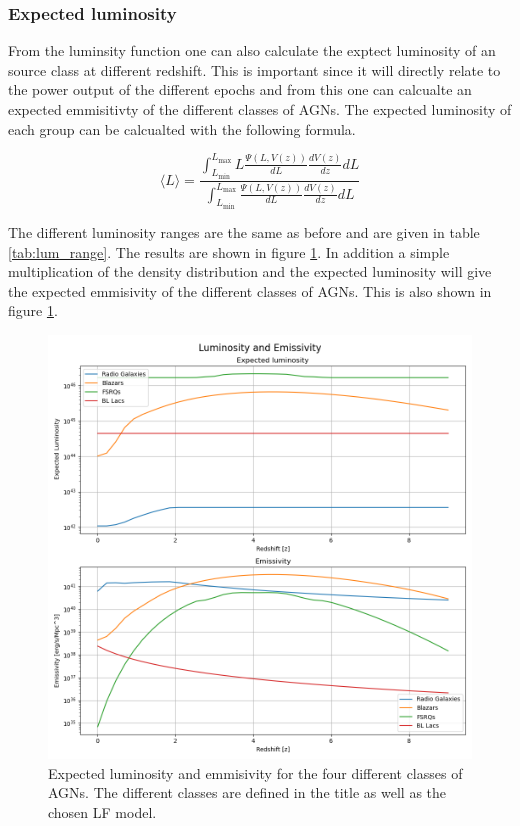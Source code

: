 \documentclass{article}
\begin{document}
\subsubsection{Expected luminosity}
From the luminsity function one can also calculate the exptect luminosity of an source class at different redshift. This is important since it will directly relate to the 
power output of the different epochs and from this one can calcualte an expected emmisitivty of the different classes of AGNs. 
The expected luminosity of each group can be calcualted with the following formula. 

\begin{equation}
    \langle L \rangle = \frac{\int_{L_{\text{min}}}^{L_{\text{max}}} L \frac{\Psi(L, V(z))}{dL} \frac{dV(z)}{dz} dL}{\int_{L_{\text{min}}}^{L_{\text{max}}} \frac{\Psi(L, V(z))}{dL} \frac{dV(z)}{dz} dL}
\end{equation}

The different luminosity ranges are the same as before and are given in table \ref{tab:lum_range}. The results are shown in figure \ref{fig:EL}.
In addition a simple multiplication of the density distribution and the expected luminosity will give the expected emmisivity of the different classes of AGNs. This is also shown in figure \ref{fig:EL}.

\begin{figure}
    \centering
    \includegraphics[width = \textwidth]{Luminosity and Emissivity.png}
    \caption{Expected luminosity and emmisivity for the four different classes of AGNs. The different classes are defined in the title as well as the chosen LF model.}
    \label{fig:EL}
\end{figure}
\end{document}
